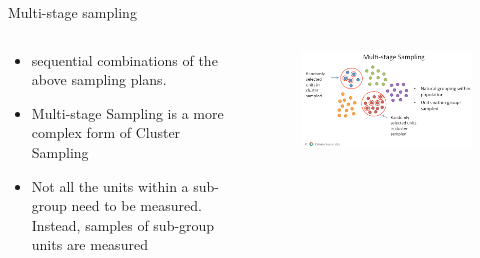\documentclass[10pt, compress]{beamer}
\begin{document}
\begin{frame}[t]{Multi-stage sampling}
    \begin{columns}
        \begin{block}{}
            \begin{itemize}
                \item sequential combinations of the above sampling plans.
                \item Multi-stage Sampling is a more complex form of Cluster Sampling
                \item Not all the units within a sub-group need to be measured. Instead, samples of sub-group units are measured
            \end{itemize}
        \end{block}
        \begin{block}{}
            \begin{figure}
                \begin{center}
                    \includegraphics[scale=0.25]{img/Slide6.png}
                \end{center}
            \end{figure}
        \end{block}
    \end{columns}

\end{frame}
\end{document}
